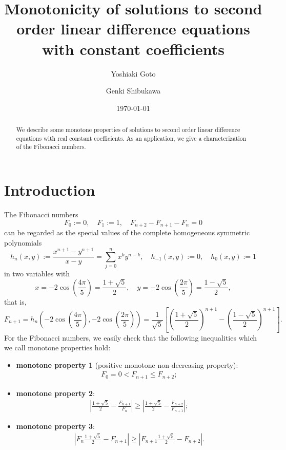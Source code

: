 \documentclass[a4paper,11pt,reqno]{amsart}
\title[Monotonicity of second order difference equations]{
  Monotonicity of solutions to second order linear difference equations with constant coefficients
}
\author[Y. Goto]{Yoshiaki Goto}
\author[G. Shibukawa]{Genki Shibukawa}
\date{\today}
\theoremstyle{plain}
\theoremstyle{definition}
\begin{document}
\begin{abstract}
  We describe some monotone properties of solutions to 
  second order linear difference equations with real constant coefficients. 
  As an application, we give a characterization of the Fibonacci numbers.  
\end{abstract}

\maketitle

\section{Introduction}
The Fibonacci numbers
$$
F_{0}:=0, \quad F_{1}:=1, \quad F_{n+2}-F_{n+1}-F_{n}=0
$$
can be regarded as the special values of the complete homogeneous symmetric polynomials 
$$
h_{n}(x,y)
   :=
   \frac{x^{n+1}-y^{n+1}}{x-y}
   =
   \sum_{j=0}^{n}x^{k}y^{n-k}, \quad 
   h_{-1}(x,y):=0, \quad 
   h_{0}(x,y):=1
$$
in two variables with 
$$
x=-2\cos{\left(\frac{4\pi }{5}\right)}=\frac{1+\sqrt{5}}{2}, \quad 
y=-2\cos{\left(\frac{2\pi }{5}\right)}=\frac{1-\sqrt{5}}{2},
$$
that is, 
$$
F_{n+1}
   =
   h_{n}\left(-2\cos{\left(\frac{4\pi }{5}\right)}, -2\cos{\left(\frac{2\pi }{5}\right)}\right)
   =
   \frac{1}{\sqrt{5}}
   \left[\left(\frac{1+\sqrt{5}}{2}\right)^{n+1}-\left(\frac{1-\sqrt{5}}{2}\right)^{n+1}\right] .
$$
For the Fibonacci numbers, we easily check that 
the following inequalities which we call monotone properties hold: 
\begin{itemize}
\item \textbf{monotone property 1} (positive monotone non-decreasing property):
\begin{align}
\label{eq:monotonic 1}
F_{0}=0<  F_{n+1}\leq F_{n+2};
\end{align}
\item \textbf{monotone property 2}:
\begin{align}
\label{eq:monotonic 2}
\left|\frac{1+\sqrt{5}}{2}-\frac{F_{n+1}}{F_{n}}\right|
   \geq \left|\frac{1+\sqrt{5}}{2}-\frac{F_{n+2}}{F_{n+1}}\right| ;
\end{align}
\item \textbf{monotone property 3}:
\begin{align}
\label{eq:monotonic 3}
\left|F_{n}\frac{1+\sqrt{5}}{2}-F_{n+1}\right|
   \geq \left|F_{n+1}\frac{1+\sqrt{5}}{2}-F_{n+2}\right|.
\end{align}
\end{itemize}
\end{document}
